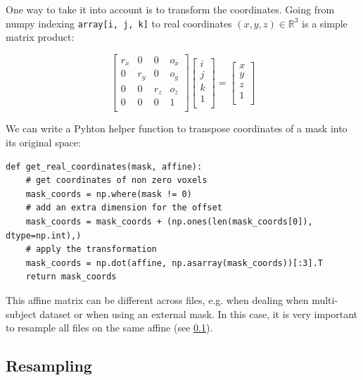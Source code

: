 \documentclass{frontiersSCNS} %
\begin{document}
One way to take it into account is to transform the coordinates. Going from
numpy indexing \verb!array[i, j, k]! to real coordinates $(x, y, z) \in
\mathbb{R}^3$ is a simple matrix product:

\[
    \begin{bmatrix}
        r_x & 0   & 0   & o_x \\
        0   & r_y & 0   & o_y \\
        0   & 0   & r_z & o_z \\
        0   & 0   & 0   & 1   \\
    \end{bmatrix}
    \begin{bmatrix}
        i \\
        j \\
        k \\
        1 \\
    \end{bmatrix}
    =
    \begin{bmatrix}
        x \\
        y \\
        z \\
        1 \\
    \end{bmatrix}
\]

We can write a Pyhton helper function to transpose coordinates of a mask into
its original space:


\begin{lstlisting}
def get_real_coordinates(mask, affine):
    # get coordinates of non zero voxels
    mask_coords = np.where(mask != 0)
    # add an extra dimension for the offset
    mask_coords = mask_coords + (np.ones(len(mask_coords[0]), dtype=np.int),)
    # apply the transformation
    mask_coords = np.dot(affine, np.asarray(mask_coords))[:3].T
    return mask_coords
\end{lstlisting}

This affine matrix can be different across files, e.g. when dealing when
multi-subject dataset or when using an external mask. In this case, it is very
important to resample all files on the same affine (see \ref{resampling}).

\subsection{Resampling}
\label{resampling}
\end{document}
